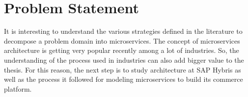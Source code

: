 \section{Problem Statement}\label{section:modeling_microservices/problem_statement}
It is interesting to understand the various strategies defined in the literature to decompose a problem domain into microservices. The concept of microservices architecture is getting very popular recently among a lot of industries. So, the understanding of the process used in industries can also add bigger value to the thesis. For this reason, the next step is to study architecture at SAP Hybris as well as the process it followed for modeling microservices to build its commerce platform.


